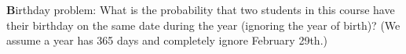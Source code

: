 \documentclass[twoside,11pt,a4paper]{article}
\newif\ifEN \ENtrue	                %
\def\tr|#1|#2|{\ifEN #2\else #1\fi}     %
\theoremstyle{definition}
\newcounter{exc}
\begin{document}
\begin{xxwrap}
\begin{exc}\label{birthday}
\tr|\textbf{Das Geburtstagsparadoxon:} Wie gross ist die Wahrscheinlichkeit, dass zwei SchülerInnen dieser Klasse am gleichen Tag Geburtstag haben? (Wir nehmen an, dass das Jahr 365 Tage hat.) 
   |\textbf{Birthday problem:} What is the probability that two students in  this course have their birthday on the same date during the year (ignoring the year of birth)? 
    (We assume a year has 365 days and completely ignore February 29th.)|
\end{exc}

\end{xxwrap}
\end{document}
